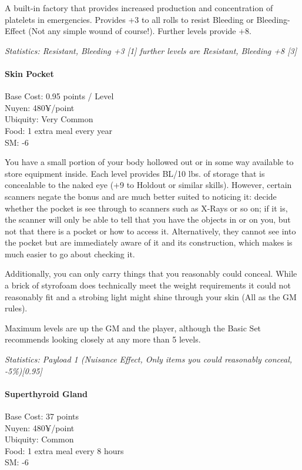 \begin{multicols*}{3}
	A built-in factory that provides increased production and concentration of platelets in emergencies. Provides +3 to all rolls to resist Bleeding or Bleeding-Effect (Not any simple wound of course!). Further levels provide +8.
	
	\textit{\textcolor{OliveGreen}{Statistics: Resistant, Bleeding +3 [1] further levels are Resistant, Bleeding +8 [3]}}
	
	\paragraph{Skin Pocket}\label{skin_pocket}
	\begin{flushright}
		Base Cost: 0.95 points / Level\\
		Nuyen: 480¥/point\\
		Ubiquity: Very Common\\
		Food: 1 extra meal every year\\
		SM: -6\\
	\end{flushright}
	
	You have a small portion of your body hollowed out or in some way available to store equipment inside. Each level provides BL/10 lbs. of storage that is concealable to the naked eye (+9 to Holdout or similar skills). However, certain scanners negate the bonus and are much better suited to noticing it: decide whether the pocket is see through to scanners such as X-Rays or so on; if it is, the scanner will only be able to tell that you have the objects in or on you, but not that there is a pocket or how to access it. Alternatively, they cannot see into the pocket but are immediately aware of it and its construction, which makes is much easier to go about checking it.
	
	Additionally, you can only carry things that you reasonably could conceal. While a brick of styrofoam does technically meet the weight requirements it could not reasonably fit and a strobing light might shine through your skin (All as the GM rules).
	
	Maximum levels are up the GM and the player, although the Basic Set recommends looking closely at any more than 5 levels.
	
	\textit{\textcolor{OliveGreen}{Statistics: Payload 1 (Nuisance Effect, Only items you could reasonably conceal, -5\%)[0.95]}}
	
	\paragraph{Superthyroid Gland}
	\begin{flushright}
		Base Cost: 37 points\\
		Nuyen: 480¥/point\\
		Ubiquity: Common\\
		Food: 1 extra meal every 8 hours\\
		SM: -6\\
	\end{flushright}
	

\end{multicols*}
